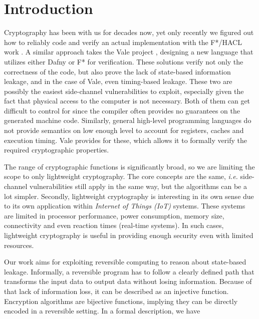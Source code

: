 \documentclass[a4paper,10pt,openright]{memoir}
\newcommand{\ie}{\emph{i.e.}\xspace}
\newcommand{\term}[1]{\textit{#1}}
\begin{document}
\chapter{Introduction}


Cryptography has been with us for decades now, yet only 
recently we figured out how to reliably code and verify an 
actual implementation with the F*/HACL work \cite{ProtzenkoEtal:2017}. 
A similar approach takes the Vale project \cite{BondEtal:2017:Vale}, 
designing a new language that utilizes either Dafny or F* for 
verification. These solutions verify not only the correctness of the 
code, but also prove the lack of state-based information leakage, and 
in the case of Vale, even timing-based leakage. These two are possibly 
the easiest side-channel vulnerabilities to exploit, especially given 
the fact that physical access to the computer is not necessary. Both of 
them can get difficult to control for since the compiler often provides 
no guarantees on the generated machine code. Similarly, general high-level programming 
languages do not provide semantics on low enough level to account for 
registers, caches and execution timing. Vale provides for these, which 
allows it to formally verify the required cryptographic properties.

The range of cryptographic functions is significantly broad, so we are 
limiting the scope to only lightweight cryptography. The core concepts 
are the same, \ie side-channel vulnerabilities still apply in the same 
way, but the algorithms can be a lot simpler. Secondly, lightweight 
cryptography is interesting in its own sense due to its own application 
within \term{Internet of Things (IoT)} systems. These systems are 
limited in processor performance, power consumption, memory size, 
connectivity and even reaction times (real-time systems). In such 
cases, lightweight cryptography is useful in providing enough security 
even with limited resources.

Our work aims for exploiting reversible computing to reason about 
state-based leakage. Informally, a reversible program has to follow a 
clearly defined path that transforms the input data to output data 
without losing information. Because of that lack of information loss, 
it can be described as an injective function. Encryption algorithms are 
bijective functions, implying they can be directly encoded in a 
reversible setting. In a formal description, we have
\end{document}
